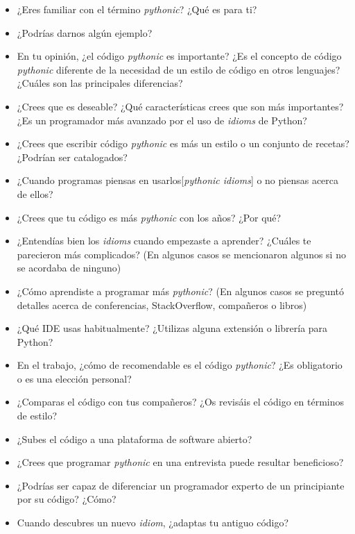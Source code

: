 \documentclass[a4paper, 12pt]{book}
\begin{document}
 \begin{itemize}
     \item ¿Eres familiar con el término \textit{pythonic}? ¿Qué es para ti?
     \item ¿Podrías darnos algún ejemplo?
     \item En tu opinión, ¿el código \textit{pythonic} es importante? ¿Es el concepto de código \textit{pythonic} diferente de la necesidad de un estilo de código en otros lenguajes? ¿Cuáles son las principales diferencias?
     \item ¿Crees que es deseable? ¿Qué características crees que son más importantes? ¿Es un programador más avanzado por el uso de \textit{idioms} de Python?
     \item ¿Crees que escribir código \textit{pythonic} es más un estilo o un conjunto de recetas? ¿Podrían ser catalogados?
     \item ¿Cuando programas piensas en usarlos[\textit{pythonic idioms}] o no piensas acerca de ellos?
     \item ¿Crees que tu código es más \textit{pythonic} con los años? ¿Por qué?
     \item ¿Entendías bien los \textit{idioms} cuando empezaste a aprender? ¿Cuáles te parecieron más complicados? (En algunos casos se mencionaron algunos si no se acordaba de ninguno)
     \item ¿Cómo aprendiste a programar más \textit{pythonic}? (En algunos casos se preguntó detalles acerca de conferencias, StackOverflow, compañeros o libros)
     \item ¿Qué IDE usas habitualmente? ¿Utilizas alguna extensión o librería para Python?
     \item En el trabajo, ¿cómo de recomendable es el código \textit{pythonic}? ¿Es obligatorio o es una elección personal?
     \item ¿Comparas el código con tus compañeros? ¿Os revisáis el código en términos de estilo?
     \item ¿Subes el código a una plataforma de software abierto?
     \item ¿Crees que programar \textit{pythonic} en una entrevista puede resultar beneficioso?
     \item ¿Podrías ser capaz de diferenciar un programador experto de un principiante por su código? ¿Cómo?
     \item Cuando descubres un nuevo \textit{idiom}, ¿adaptas tu antiguo código?
 \end{itemize}
\end{document}

